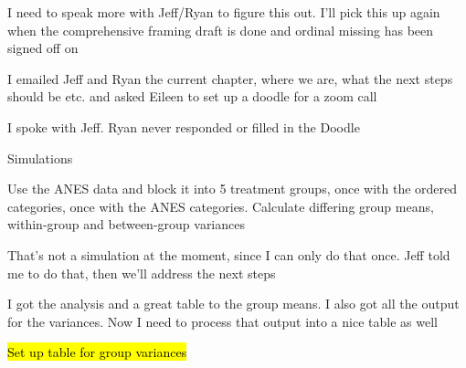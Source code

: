 \documentclass[12pt]{article}
\begin{document}
\begin{coi}
\begin{coi}
				\item I need to speak more with Jeff/Ryan to figure this out. I'll pick this up again when the comprehensive framing draft is done and ordinal missing has been signed off on
				\item I emailed Jeff and Ryan the current chapter, where we are, what the next steps should be etc. and asked Eileen to set up a doodle for a zoom call
				\item I spoke with Jeff. Ryan never responded or filled in the Doodle
			\end{coi}
		\item Simulations
			\begin{coi}
				\item Use the ANES data and block it into 5 treatment groups, once with the ordered categories, once with the ANES categories. Calculate differing group means, within-group and between-group variances
				\item That's not a simulation at the moment, since I can only do that once. Jeff told me to do that, then we'll address the next steps
				\item I got the analysis and a great table to the group means. I also got all the output for the variances. Now I need to process that output into a nice table as well
				\item \hl{Set up table for group variances}
			\end{coi}
	\end{coi}
	
	
\end{document}
